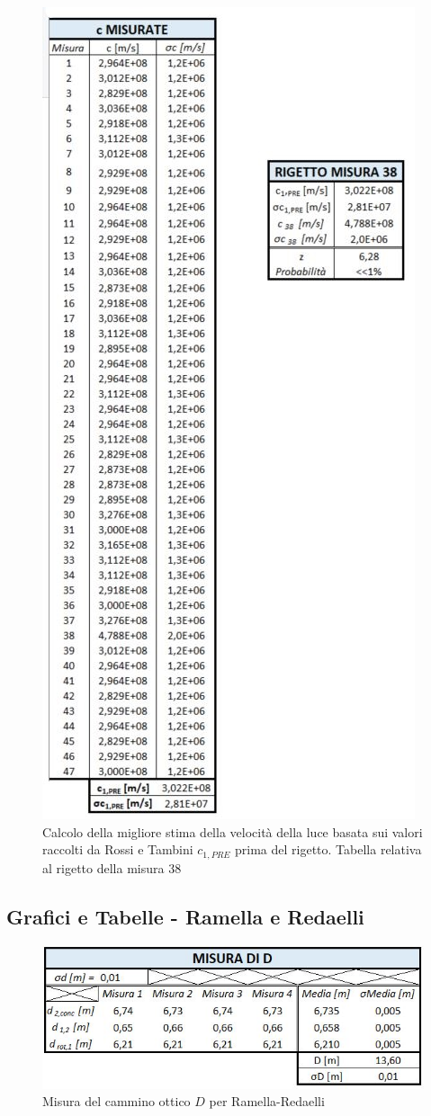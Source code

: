 \documentclass{article}
\begin{document}
\begin{figure}[h]
    \centering
    \includegraphics[width=0.6\linewidth]{Rigetto.JPG}
    \caption{Calcolo della migliore stima della velocità della luce basata sui valori raccolti da Rossi e Tambini $c_{1,PRE}$ prima del rigetto. Tabella relativa al rigetto della misura 38}
    \label{Rigetto}
\end{figure}
\FloatBarrier %

\newpage
\subsection{Grafici e Tabelle - Ramella e Redaelli} \label{RAM}

\begin{figure}[h!]
    \centering
    \includegraphics[width=0.55\linewidth]{RAM_D.JPG}
    \caption{Misura del cammino ottico $D$ per Ramella-Redaelli}
    \label{RAM_D}
\end{figure}
\end{document}
